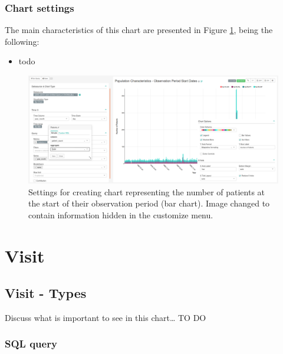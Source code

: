 \documentclass[]{book}
\providecommand{\tightlist}{%
  \setlength{\itemsep}{0pt}\setlength{\parskip}{0pt}}
\begin{document}
\subsection{Chart settings}\label{chart-settings-12}

The main characteristics of this chart are presented in Figure
\ref{fig:populationCharacteristicsObservationPeriodStartDates}, being
the following:

\begin{itemize}
\tightlist
\item
  todo
\end{itemize}

\begin{figure}
\includegraphics[width=1\linewidth]{images/populationCharacteristicsObservationPeriodStartDates} \caption{Settings for creating chart representing the number of patients at the start of their observation period (bar chart). Image changed to contain information hidden in the customize menu.}\label{fig:populationCharacteristicsObservationPeriodStartDates}
\end{figure}

\chapter{Visit}\label{visit}

\section{Visit - Types}\label{visit---types}

Discuss what is important to see in this chart\ldots{} TO DO

\subsection{SQL query}\label{sql-query-13}
\end{document}
